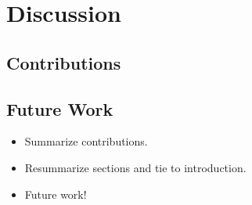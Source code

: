 \section{Discussion}
\subsection{Contributions}

\subsection{Future Work}


\begin{itemize}
    \item Summarize contributions. 
    \item Resummarize sections and tie to introduction. 
    \item Future work! 
\end{itemize}